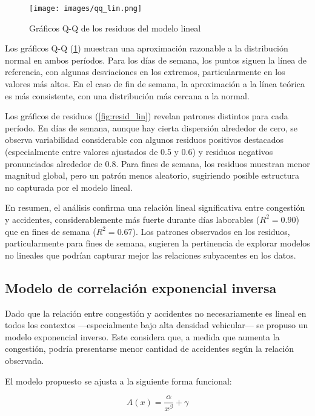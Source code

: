 \documentclass[12pt]{article}
\begin{document}
{\begin{figure}[H]
\centering
\texttt{[image: images/qq\_lin.png]}
\caption{Gráficos Q-Q de los residuos del modelo lineal}
\label{fig:qq_lin}
\end{figure}

Los gráficos Q-Q (\cref{fig:qq_lin}) muestran una aproximación razonable a la distribución normal en ambos períodos. Para los días de semana, los puntos siguen la línea de referencia, con algunas desviaciones en los extremos, particularmente en los valores más altos. En el caso de fin de semana, la aproximación a la línea teórica es más consistente, con una distribución más cercana a la normal.

Los gráficos de residuos (\cref{fig:resid_lin}) revelan patrones distintos para cada período. En días de semana, aunque hay cierta dispersión alrededor de cero, se observa variabilidad considerable con algunos residuos positivos destacados (especialmente entre valores ajustados de 0.5 y 0.6) y residuos negativos pronunciados alrededor de 0.8. Para fines de semana, los residuos muestran menor magnitud global, pero un patrón menos aleatorio, sugiriendo posible estructura no capturada por el modelo lineal.

En resumen, el análisis confirma una relación lineal significativa entre congestión y accidentes, considerablemente más fuerte durante días laborables ($R^2 = 0.90$) que en fines de semana ($R^2 = 0.67$). Los patrones observados en los residuos, particularmente para fines de semana, sugieren la pertinencia de explorar modelos no lineales que podrían capturar mejor las relaciones subyacentes en los datos.


\subsection{Modelo de correlación exponencial inversa}

Dado que la relación entre congestión y accidentes no necesariamente es lineal en todos los contextos —especialmente bajo alta densidad vehicular— se propuso un modelo exponencial inverso. Este considera que, a medida que aumenta la congestión, podría presentarse menor cantidad de accidentes según la relación observada.

El modelo propuesto se ajusta a la siguiente forma funcional:

\begin{equation}
A(x) = \frac{\alpha}{x^{\beta}} + \gamma
\end{equation}

}
\end{document}
